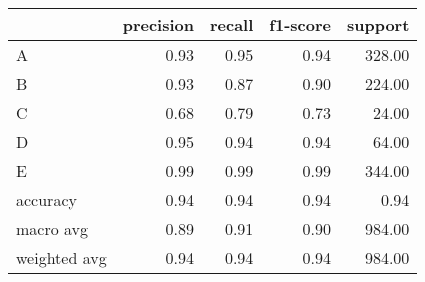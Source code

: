 \begin{tabular}{|l|r|r|r|r|}
\hline
{} &  precision &  recall &  f1-score &  support \\
\hline
A            &       0.93 &    0.95 &      0.94 &   328.00 \\
B            &       0.93 &    0.87 &      0.90 &   224.00 \\
C            &       0.68 &    0.79 &      0.73 &    24.00 \\
D            &       0.95 &    0.94 &      0.94 &    64.00 \\
E            &       0.99 &    0.99 &      0.99 &   344.00 \\
accuracy     &       0.94 &    0.94 &      0.94 &     0.94 \\
macro avg    &       0.89 &    0.91 &      0.90 &   984.00 \\
weighted avg &       0.94 &    0.94 &      0.94 &   984.00 \\
\hline
\end{tabular}
